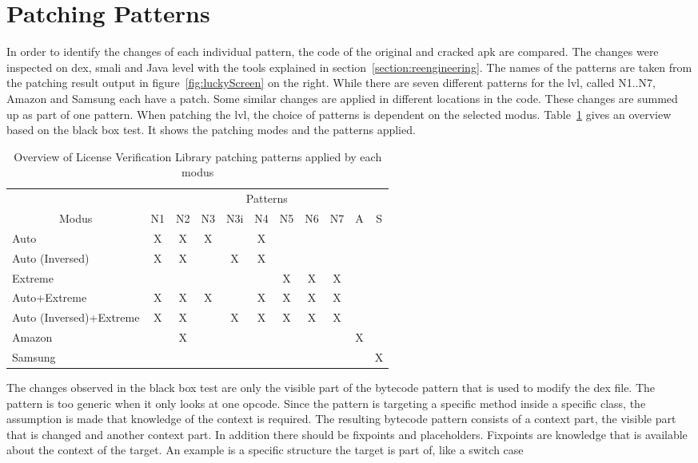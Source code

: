 \section{Patching Patterns} \label{section:luckypatcher-patterns}
In order to identify the changes of each individual pattern, the code of the original and cracked \gls{apk} are compared.
The changes were inspected on dex, smali and Java level with the tools explained in section~\ref{section:reengineering}.
\newline
The names of the patterns are taken from the patching result output in figure~\ref{fig:luckyScreen} on the right.
While there are seven different patterns for the \gls{lvl}, called N1..N7, Amazon and Samsung each have a patch.
Some similar changes are applied in different locations in the code.
These changes are summed up as part of one pattern.
\newline
When patching the \gls{lvl}, the choice of patterns is dependent on the selected modus.
Table~\ref{table:patterns} gives an overview based on the black box test.
It shows the patching modes and the patterns applied.
\newline
\begin{table}[h]
\centering
\begin{tabular}{l|cccccccccc}
                           & \multicolumn{10}{c}{Patterns}           \\
\multicolumn{1}{c|}{Modus} & N1 & N2 & N3 & N3i & N4 & N5 & N6 & N7 & A & S \\ \hline
Auto                       & X  & X  & X  &     & X  &    &    &  &&  \\
Auto (Inversed)            & X  & X  &    & X   & X  &    &    &  &&  \\
Extreme                    &    &    &    &     &    & X  & X  & X && \\
Auto+Extreme               & X  & X  & X  &     & X  & X  & X  & X && \\
Auto (Inversed)+Extreme    & X  & X  &    & X   & X  & X  & X  &X &&\\
Amazon               &   &  X&   &     &   &   &   &  &X&\\
Samsung               &   &   &   &     &   &   &   &   &&X
\end{tabular}
\caption{Overview of License Verification Library patching patterns applied by each modus}
\label{table:patterns}
\end{table}
The changes observed in the black box test are only the visible part of the bytecode pattern that is used to modify the dex file.
The pattern is too generic when it only looks at one opcode.
Since the pattern is targeting a specific method inside a specific class, the assumption is made that knowledge of the context is required.
The resulting bytecode pattern consists of a context part, the visible part that is changed and another context part.
In addition there should be fixpoints and placeholders.
Fixpoints are knowledge that is available about the context of the target.
An example is a specific structure the target is part of, like a switch case

